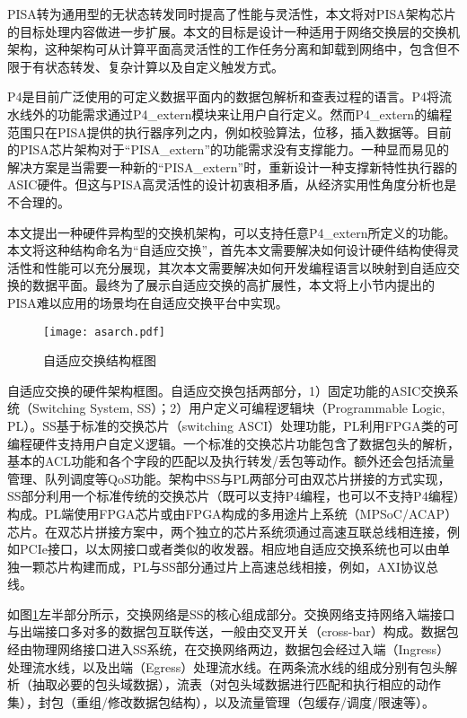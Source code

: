 PISA转为通用型的无状态转发同时提高了性能与灵活性，本文将对PISA架构芯片的目标处理内容做进一步扩展。本文的目标是设计一种适用于网络交换层的交换机架构，这种架构可从计算平面高灵活性的工作任务分离和卸载到网络中，包含但不限于有状态转发、复杂计算以及自定义触发方式。




P4是目前广泛使用的可定义数据平面内的数据包解析和查表过程的语言。P4将流水线外的功能需求通过P4\_extern模块来让用户自行定义。然而P4\_extern的编程范围只在PISA提供的执行器序列之内，例如校验算法，位移，插入数据等。目前的PISA芯片架构对于“PISA\_extern”的功能需求没有支撑能力。一种显而易见的解决方案是当需要一种新的“PISA\_extern”时，重新设计一种支撑新特性执行器的ASIC硬件。但这与PISA高灵活性的设计初衷相矛盾，从经济实用性角度分析也是不合理的。

本文提出一种硬件异构型的交换机架构，可以支持任意P4\_extern所定义的功能。本文将这种结构命名为“自适应交换”，首先本文需要解决如何设计硬件结构使得灵活性和性能可以充分展现，其次本文需要解决如何开发编程语言以映射到自适应交换的数据平面。最终为了展示自适应交换的高扩展性，本文将上小节内提出的PISA难以应用的场景均在自适应交换平台中实现。


\begin{figure}[!ht]
	\centering 
	\texttt{[image: asarch.pdf]}
	\caption{自适应交换结构框图} \label{fig:asarch}
\end{figure}

自适应交换的硬件架构框图。自适应交换包括两部分，1）固定功能的ASIC交换系统（Switching System, SS）；2）用户定义可编程逻辑块（Programmable Logic, PL）。SS基于标准的交换芯片（switching ASCI）处理功能，PL利用FPGA类的可编程硬件支持用户自定义逻辑。一个标准的交换芯片功能包含了数据包头的解析，基本的ACL功能和各个字段的匹配以及执行转发/丢包等动作。额外还会包括流量管理、队列调度等QoS功能。架构中SS与PL两部分可由双芯片拼接的方式实现，SS部分利用一个标准传统的交换芯片（既可以支持P4编程，也可以不支持P4编程）构成。PL端使用FPGA芯片或由FPGA构成的多用途片上系统（MPSoC/ACAP）芯片。在双芯片拼接方案中，两个独立的芯片系统须通过高速互联总线相连接，例如PCIe接口，以太网接口或者类似的收发器。相应地自适应交换系统也可以由单独一颗芯片构建而成，PL与SS部分通过片上高速总线相接，例如，AXI协议总线。

如图\ref{fig:asarch}左半部分所示，交换网络是SS的核心组成部分。交换网络支持网络入端接口与出端接口多对多的数据包互联传送，一般由交叉开关（cross-bar）构成。数据包经由物理网络接口进入SS系统，在交换网络两边，数据包会经过入端（Ingress）处理流水线，以及出端（Egress）处理流水线。在两条流水线的组成分别有包头解析（抽取必要的包头域数据），流表（对包头域数据进行匹配和执行相应的动作集），封包（重组/修改数据包结构），以及流量管理（包缓存/调度/限速等）。

